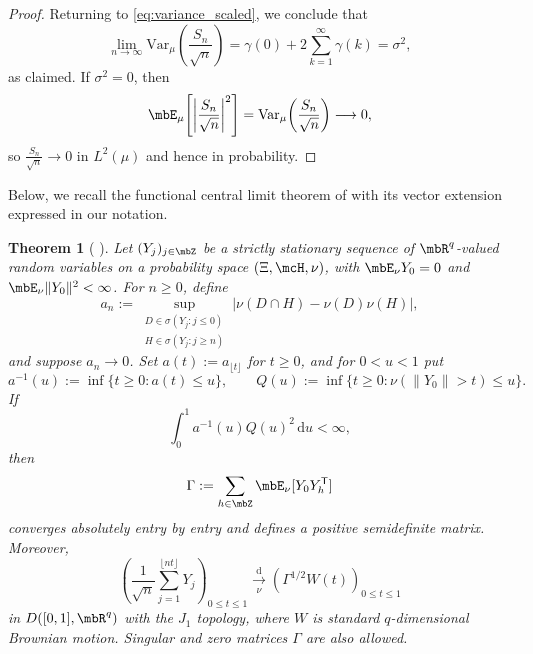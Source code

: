 \documentclass[a4paper]{article}
\numberwithin{equation}{section}   %
\theoremstyle{plain}   %
\theoremstyle{plain}   %
\newtheorem{theorem}{Theorem}[section]  %
\theoremstyle{examplestyle}
\newcommand{\dee}{\mathrm{d}}           %
\begin{document}
\begin{proof}
            Returning to \eqref{eq:variance_scaled}, we conclude that
            \[
                \lim_{n\to\infty}
                \mathrm{Var}_\mu\!\left(\frac{S_n}{\sqrt{n}}\right)
                = \gamma(0) + 2\sum_{k=1}^\infty \gamma(k)
                = \sigma^2,
            \]
            as claimed.
            If $\sigma^2=0$, then
            \[
                \mbE_\mu\!\left[\left|\frac{S_n}{\sqrt{n}}\right|^2\right]
                = \mathrm{Var}_\mu\!\left(\frac{S_n}{\sqrt{n}}\right)
                \longrightarrow 0,
            \]
            so $\frac{S_n}{\sqrt{n}}\to0$ in $L^2(\mu)$ and hence in probability.
        \end{proof}

    Below, we recall the functional central limit theorem of \cite[Theorem~1]{DMR94} with its vector extension expressed in our notation.
    
    \begin{theorem}[{ \cite[Theorem~1]{DMR94}}]
    \label{thm:DMR_FCLT}
        Let $(Y_j)_{j\in\mbZ}$ be a strictly stationary sequence of $\mbR^q$-valued random variables on a probability space $(\Xi,\mcH,\nu)$, with $\mbE_\nu Y_0=0$ and $\mbE_\nu\|Y_0\|^2<\infty$. For $n\ge0$, define
        \[
         a_n:=\sup_{\substack{D\in\sigma(Y_j:j\le0)\\
                               H\in\sigma(Y_j:j\ge n)}}
               |\nu(D\cap H)-\nu(D)\nu(H)|,
        \]
        and suppose $a_n\to0$.
        Set $a(t):=a_{\lfloor t\rfloor}$ for $t\ge0$, and for $0<u<1$ put
        \[
         a^{-1}(u):=\inf\{t\ge0:a(t)\le u\},
         \qquad
         Q(u):=\inf\{t\ge0:\nu(\|Y_0\|>t)\le u\}.
        \]
        If
        \begin{equation}
        \label{eq:DMR-quantile-condition}
         \int_0^1 a^{-1}(u)Q(u)^2\,\dee u<\infty,
        \end{equation}
        then
        \[
         \Gamma:=\sum_{h\in\mbZ}\mbE_\nu[Y_0Y_h^{\mathsf T}]
        \]
        converges absolutely entry by entry and defines a positive semidefinite matrix. Moreover,
        \[
         \left(\frac1{\sqrt n}\sum_{j=1}^{\lfloor nt\rfloor}Y_j\right)_{0\le t\le1}
         \underset{\nu}{\overset{\mathrm d}{\longrightarrow}}
         \left(\Gamma^{1/2}W(t)\right)_{0\le t\le1}
        \]
        in $D([0,1],\mbR^q)$ with the $J_1$ topology, where $W$ is standard $q$-dimensional Brownian motion.
        Singular and zero matrices $\Gamma$ are also allowed.
    \end{theorem}
\end{document}
